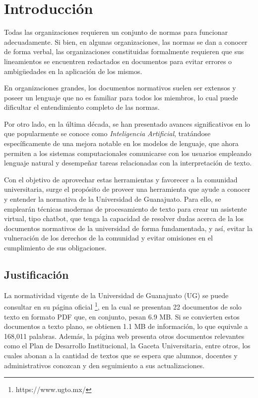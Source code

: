 \chapter{Introducción}

Todas las organizaciones requieren un conjunto de normas para funcionar adecuadamente.
Si bien, en algunas organizaciones, las normas se dan a conocer de forma verbal,
las organizaciones constituidas formalmente requieren que sus lineamientos se encuentren
redactados en documentos para evitar errores o ambigüedades en la
aplicación de los mismos.

En organizaciones grandes, los documentos normativos suelen ser extensos y poseer un
lenguaje que no es familiar para todos los miembros, lo cual puede dificultar el
entendimiento completo de las normas.

Por otro lado, en la última década, se han presentado avances significativos
en lo que popularmente se conoce como \textit{Inteligencia Artificial}, tratándose
específicamente de una mejora notable en los modelos de lenguaje, que ahora
permiten a los sistemas computacionales comunicarse con los usuarios empleando
lenguaje natural y desempeñar tareas relacionadas con la interpretación de texto.

Con el objetivo de aprovechar estas herramientas y favorecer a la comunidad
universitaria, surge el propósito de proveer una herramienta que ayude a conocer
y entender la normativa de la Universidad de Guanajuato. Para ello, se emplearán
técnicas modernas de procesamiento de texto para crear un asistente virtual,
tipo chatbot, que tenga la capacidad de resolver dudas acerca de la los
documentos normativos de la universidad de forma fundamentada, y así, evitar
la vulneración de los derechos de la comunidad y evitar omisiones en el
cumplimiento de sus obligaciones.

\section{Justificación}

La normatividad vigente de la Universidad de Guanajuato (UG) se puede consultar
en su página oficial \footnote{https://www.ugto.mx/}, en la cual se presentan
22 documentos de solo texto en formato PDF que, en conjunto, pesan 6.9 MB. Si
se convierten estos documentos a texto plano, se obtienen 1.1 MB de información,
lo que equivale a 168,011 palabras. Además, la página web presenta otros documentos
relevantes como el Plan de Desarrollo Institucional, la Gaceta Universitaria,
entre otros, los cuales abonan a la cantidad de textos que se espera que
alumnos, docentes y administrativos conozcan y den seguimiento a sus actualizaciones.

